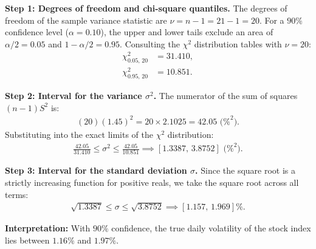 \begin{solucion}
	\textbf{Step 1: Degrees of freedom and chi-square quantiles.}
	The degrees of freedom of the sample variance statistic are $\nu = n - 1 = 21 - 1 = 20$.
	For a $90\%$ confidence level ($\alpha = 0.10$), the upper and lower tails exclude an area of $\alpha/2 = 0.05$ and $1-\alpha/2 = 0.95$. Consulting the $\chi^2$ distribution tables with $\nu = 20$:
	\begin{align}
		\chi^2_{0.05, \, 20} &= 31.410, \\
		\chi^2_{0.95, \, 20} &= 10.851.
	\end{align}
	
	\textbf{Step 2: Interval for the variance $\sigma^2$.}
	The numerator of the sum of squares $(n-1)S^2$ is:
	\begin{align}
		(20)(1.45)^2 = 20 \times 2.1025 = 42.05 \text{ (\%}^2\text{).}
	\end{align}
	Substituting into the exact limits of the $\chi^2$ distribution:
	\begin{align}
		\frac{42.05}{31.410} \le \sigma^2 \le \frac{42.05}{10.851} \implies [1.3387, \, 3.8752] \text{ (\%}^2\text{).}
	\end{align}
	
	\textbf{Step 3: Interval for the standard deviation $\sigma$.}
	Since the square root is a strictly increasing function for positive reals, we take the square root across all terms:
	\begin{align}
		\sqrt{1.3387} \le \sigma \le \sqrt{3.8752} \implies [1.157, \, 1.969] \%.
	\end{align}
	
	\textbf{Interpretation:} With $90\%$ confidence, the true daily volatility of the stock index lies between $1.16\%$ and $1.97\%$.
\end{solucion}

